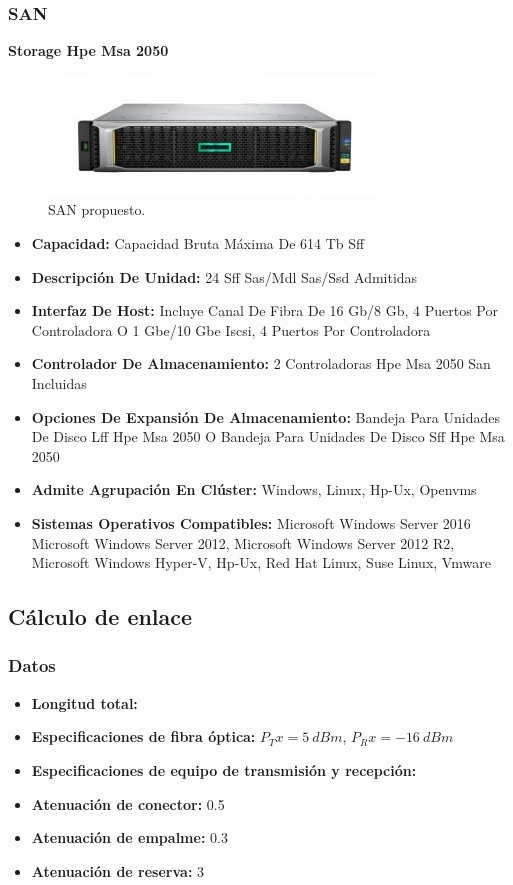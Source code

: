 \documentclass[12pt,letterpaper]{article}
\begin{document}
\newpage
\subsubsection{SAN}
\textbf{Storage Hpe Msa 2050}
\begin{figure}[ht]
    \centering
    \includegraphics[scale=.6]{imagenes/san.jpg}
    \caption{SAN propuesto.}
\end{figure}
\begin{itemize}
    \item \textbf{Capacidad: }Capacidad Bruta Máxima De 614 Tb Sff
    \item \textbf{Descripción De Unidad: }24 Sff Sas/Mdl Sas/Ssd Admitidas
    \item \textbf{Interfaz De Host: }Incluye Canal De Fibra De 16 Gb/8 Gb, 4 Puertos Por Controladora O 1 Gbe/10 Gbe Iscsi, 4 Puertos Por Controladora
    \item \textbf{Controlador De Almacenamiento: }2 Controladoras Hpe Msa 2050 San Incluidas
    \item \textbf{Opciones De Expansión De Almacenamiento: }Bandeja Para Unidades De Disco Lff Hpe Msa 2050 O Bandeja Para Unidades De Disco Sff Hpe Msa 2050
    \item \textbf{Admite Agrupación En Clúster: }Windows, Linux, Hp-Ux, Openvms
    \item \textbf{Sistemas Operativos Compatibles: }Microsoft Windows Server 2016 Microsoft Windows Server 2012, Microsoft Windows Server 2012 R2, Microsoft Windows Hyper-V, Hp-Ux, Red Hat Linux, Suse Linux, Vmware
\end{itemize}

\newpage
\subsection{Cálculo de enlace}
\subsubsection{Datos}
\begin{itemize}
    \item \textbf{Longitud total: }
    \item \textbf{Especificaciones de fibra óptica: } $P_Tx=5 \ dBm$, $P_Rx=-16 \ dBm$
    \item \textbf{Especificaciones de equipo de transmisión y recepción: }
    \item \textbf{Atenuación de conector: }0.5
    \item \textbf{Atenuación de empalme: }0.3
    \item \textbf{Atenuación de reserva: }3
\end{itemize}
\end{document}
